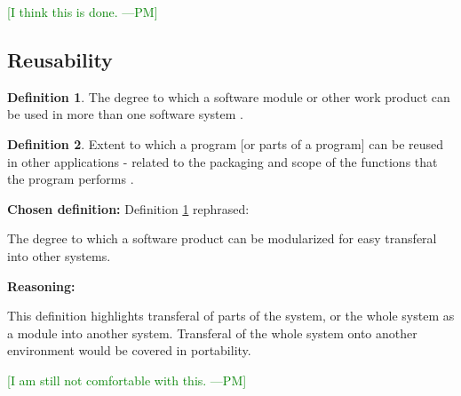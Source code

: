 \documentclass[letterpaper,cleveref]{lipics-v2019}
\newcommand{\authornote}[3]{\textcolor{#1}{[#3 ---#2]}}
\newcommand{\authornote}[3]{}
\newcommand{\pmi}[1]{\authornote{green}{PM}{#1}} %
\theoremstyle{definition}
\newtheorem{defn}{Definition}
\begin{document}
\pmi{I think this is done.}


\subsection{Reusability}
\begin{defn} \label{ReusabilityDefnSelected}
The degree to which a software module or other work product can be used in more than one software system \citep{IEEEStdGlossarySET1990}. 
\end{defn}
\begin{defn}
Extent to which a program [or parts of a program] can be reused in other applications - related to the packaging and scope of the functions that the program performs \citep{pressman2005software}.
\end{defn}

\noindent \textbf{Chosen definition:} Definition \ref{ReusabilityDefnSelected} rephrased:

The degree to which a software product can be modularized for easy transferal into other systems.

\noindent \textbf{Reasoning:}

This definition highlights transferal of parts of the system, or the whole system as a module into another system. Transferal of the whole system onto another environment would be covered in portability.

\pmi{I am still not comfortable with this.}
\end{document}
